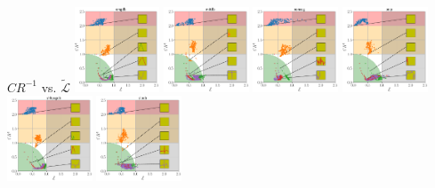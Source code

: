 \documentclass{beamer}
\begin{document}
\begin{frame}[c]{$CR^{-1}$ \textlatin{vs}. $\tilde{\mathcal{L}}$}
	\includegraphics[width=0.19\textwidth]{"images_mean_inverse_compression_ratio_vs_mean_reconstruction_loss_variable_kernel_size_list/emgdb"}
	\includegraphics[width=0.19\textwidth]{"images_mean_inverse_compression_ratio_vs_mean_reconstruction_loss_variable_kernel_size_list/mitdb"}
	\includegraphics[width=0.19\textwidth]{"images_mean_inverse_compression_ratio_vs_mean_reconstruction_loss_variable_kernel_size_list/noneeg"}
	\includegraphics[width=0.19\textwidth]{"images_mean_inverse_compression_ratio_vs_mean_reconstruction_loss_variable_kernel_size_list/prcp"}
	\\
	\includegraphics[width=0.19\textwidth]{"images_mean_inverse_compression_ratio_vs_mean_reconstruction_loss_variable_kernel_size_list/shhpsgdb"}
	\includegraphics[width=0.19\textwidth]{"images_mean_inverse_compression_ratio_vs_mean_reconstruction_loss_variable_kernel_size_list/slpdb"}

\end{frame}
\end{document}
